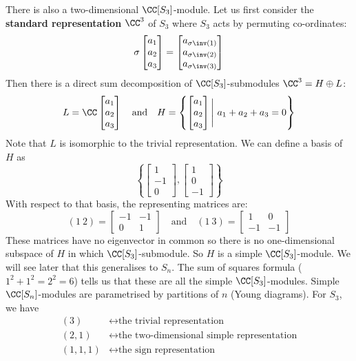 \begin{exam}
\begin{enum}
		There is also a two-dimensional $\CC[S_3]$-module.
		Let us first consider the \textbf{standard representation} $\CC^3$ of $S_3$ where $S_3$ acts by permuting co-ordinates:
		\[\sigma
		\begin{bmatrix}
			a_1 \\ a_2 \\ a_3
		\end{bmatrix}
		=
		\begin{bmatrix}
			a_{\sigma\inv(1)} \\ a_{\sigma\inv(2)} \\ a_{\sigma\inv(3)}
		\end{bmatrix}\]
		Then there is a direct sum decomposition of $\CC[S_3]$-submodules $\CC^3=H\oplus L$:
		\[L=\CC
		\begin{bmatrix}
			a_1 \\ a_2 \\ a_3
		\end{bmatrix}
		\quad\text{and}\quad
		H=\left\{
		\begin{bmatrix}
			a_1 \\ a_2 \\ a_3
		\end{bmatrix}
		\Bigg \vert \
		a_1+a_2+a_3=0
		\right\}\]
		Note that $L$ is isomorphic to the trivial representation.
		We can define a basis of $H$ as
		\[\left\{
		\begin{bmatrix}
			1 \\ -1 \\ 0
		\end{bmatrix},
		\begin{bmatrix}
			1 \\ 0 \\ -1
		\end{bmatrix}
		\right\}\]
		With respect to that basis, the representing matrices are:
		\[(1\ 2)=
		\begin{bmatrix}
			-1 & -1 \\
			0 & 1
		\end{bmatrix}
		\quad\text{and}\quad
		(1\ 3)=
		\begin{bmatrix}
			1 & 0 \\
			-1 & -1
		\end{bmatrix}
		\]
		These matrices have no eigenvector in common so there is no one-dimensional subspace of $H$ in which $\CC[S_3]$-submodule.
		So $H$ is a simple $\CC[S_3]$-module.
		We will see later that this generalises to $S_n$.
		The sum of squares formula ($1^2+1^2=2^2=6$) tells us that these are all the simple $\CC[S_3]$-modules.
		Simple $\CC[S_n]$-modules are parametrised by partitions of $n$ (Young diagrams).
		For $S_3$, we have
		\begin{align*}
			(3) &\longleftrightarrow \text{the trivial representation} \\
			(2,1) &\longleftrightarrow \text{the two-dimensional simple representation} \\
			(1,1,1) &\longleftrightarrow \text{the sign representation}
		\end{align*}
	\end{enum}
\end{exam}
